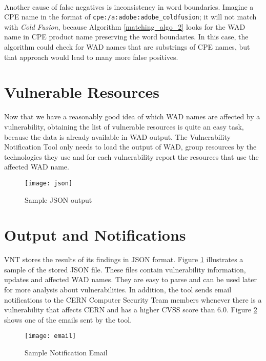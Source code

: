 \paragraph{}
Another cause of false negatives is inconsistency in word boundaries. Imagine a CPE name in the format of \texttt{cpe:/a:adobe:adobe\_coldfusion}; it will not match with \textit{Cold Fusion}, because Algorithm \ref{matching_algo_2} looks for the WAD name in CPE product name preserving the word boundaries. In this case, the algorithm could check for WAD names that are substrings of CPE names, but that approach would lead to many more false positives.


\section{Vulnerable Resources}
Now that we have a reasonably good idea of which WAD names are affected by a vulnerability, obtaining the list of vulnerable resources is quite an easy task, because the data is already available in WAD output. The Vulnerability Notification Tool only needs to load the output of WAD, group resources by the technologies they use and for each vulnerability report the resources that use the affected WAD name.
\\
\begin{figure}[H]
  \centering
    \texttt{[image: json]}
  \caption{Sample JSON output}
   \label{figure:json_output}
\end{figure}

\section{Output and Notifications}
VNT stores the results of its findings in JSON format. Figure \ref{figure:json_output} illustrates a sample of the stored JSON file. These files contain vulnerability information, updates and affected WAD names. They are easy to parse and can be used later for more analysis about vulnerabilities.
In addition, the tool sends email notifications to the CERN Computer Security Team members whenever there is a vulnerability that affects CERN and has a higher CVSS score than 6.0. Figure \ref{figure:email_output} shows one of the emails sent by the tool.

\begin{figure}[h!]
  \centering
    \texttt{[image: email]}
  \caption{Sample Notification Email}
 \label{figure:email_output}

\end{figure}



